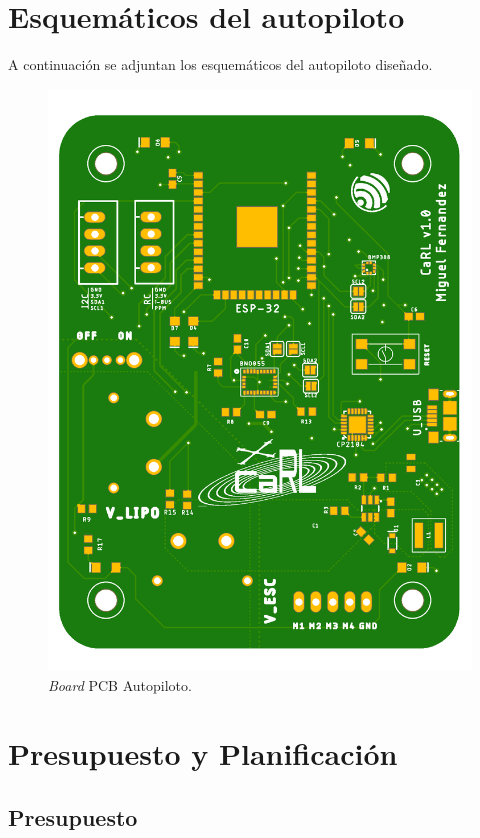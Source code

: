 \appendix
\chapter {Esquemáticos del autopiloto}
A continuación se adjuntan los esquemáticos del autopiloto diseñado.

\begin{figure}[htb!]
	\centering
	\includegraphics[height=0.7\textheight]{CaRLv1}
	\caption{\textit{Board} PCB Autopiloto.}
	\label{gantt}	
\end{figure}


 
\chapter{Presupuesto y Planificación}
\section{Presupuesto}

